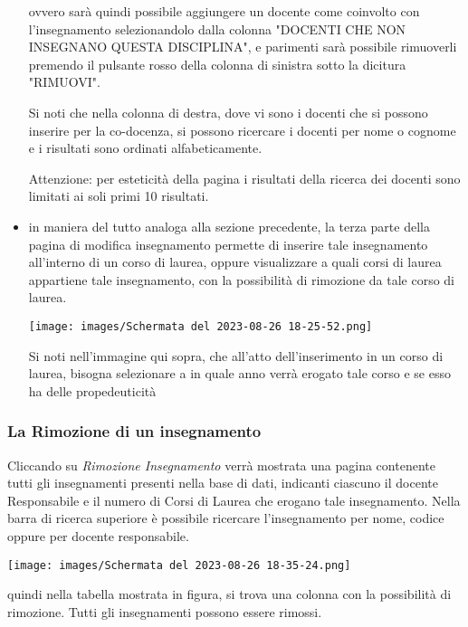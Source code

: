 \documentclass{article}
\begin{document}
\begin{itemize}
        ovvero sarà quindi possibile aggiungere un docente come coinvolto con l'insegnamento selezionandolo dalla colonna "DOCENTI CHE NON INSEGNANO QUESTA DISCIPLINA", e parimenti sarà possibile rimuoverli premendo il pulsante rosso della colonna di sinistra sotto la dicitura "RIMUOVI".

        Si noti che nella colonna di destra, dove vi sono i docenti che si possono inserire per la co-docenza, si possono ricercare i docenti per nome o cognome e i risultati sono ordinati alfabeticamente.

        Attenzione: per esteticità della pagina i risultati della ricerca dei docenti sono limitati ai soli primi 10 risultati.

        \item in maniera del tutto analoga alla sezione precedente, la terza parte della pagina di modifica insegnamento permette di inserire tale insegnamento all'interno di un corso di laurea, oppure visualizzare a quali corsi di laurea appartiene tale insegnamento, con la possibilità di rimozione da tale corso di laurea.

        \begin{center}
            \texttt{[image: images/Schermata del 2023-08-26 18-25-52.png]}
        \end{center}

        Si noti nell'immagine qui sopra, che all'atto dell'inserimento in un corso di laurea, bisogna selezionare a in quale anno verrà erogato tale corso e se esso ha delle propedeuticità
    \end{itemize}

    \subsubsection{La Rimozione di un insegnamento}
    Cliccando su \textit{Rimozione Insegnamento} verrà mostrata una pagina contenente tutti gli insegnamenti presenti nella base di dati, indicanti ciascuno il docente Responsabile e il numero di Corsi di Laurea che erogano tale insegnamento. Nella barra di ricerca superiore è possibile ricercare l'insegnamento per nome, codice oppure per docente responsabile.

    \begin{center}
        \texttt{[image: images/Schermata del 2023-08-26 18-35-24.png]}
    \end{center}

    quindi nella tabella mostrata in figura, si trova una colonna con la possibilità di rimozione. Tutti gli insegnamenti possono essere rimossi.
\end{document}

